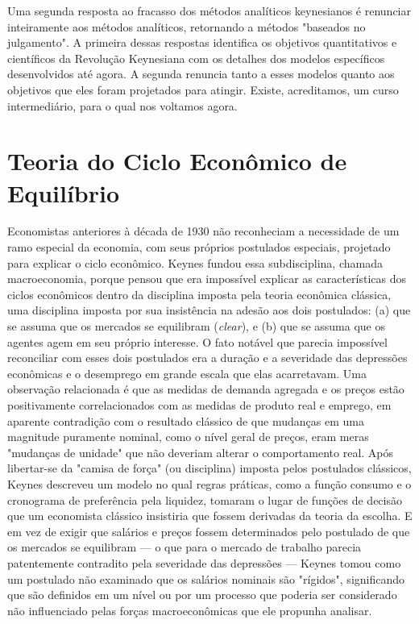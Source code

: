 \documentclass[12pt]{article}
\begin{document}
Uma segunda resposta ao fracasso dos métodos analíticos keynesianos é renunciar inteiramente aos métodos analíticos, retornando a métodos "baseados no julgamento". A primeira dessas respostas identifica os objetivos quantitativos e científicos da Revolução Keynesiana com os detalhes dos modelos específicos desenvolvidos até agora. A segunda renuncia tanto a esses modelos quanto aos objetivos que eles foram projetados para atingir. Existe, acreditamos, um curso intermediário, para o qual nos voltamos agora.

\section{Teoria do Ciclo Econômico de Equilíbrio}

Economistas anteriores à década de 1930 não reconheciam a necessidade de um ramo especial da economia, com seus próprios postulados especiais, projetado para explicar o ciclo econômico. Keynes fundou essa subdisciplina, chamada macroeconomia, porque pensou que era impossível explicar as características dos ciclos econômicos dentro da disciplina imposta pela teoria econômica clássica, uma disciplina imposta por sua insistência na adesão aos dois postulados: (a) que se assuma que os mercados se equilibram (\textit{clear}), e (b) que se assuma que os agentes agem em seu próprio interesse. O fato notável que parecia impossível reconciliar com esses dois postulados era a duração e a severidade das depressões econômicas e o desemprego em grande escala que elas acarretavam. Uma observação relacionada é que as medidas de demanda agregada e os preços estão positivamente correlacionados com as medidas de produto real e emprego, em aparente contradição com o resultado clássico de que mudanças em uma magnitude puramente nominal, como o nível geral de preços, eram meras "mudanças de unidade" que não deveriam alterar o comportamento real. Após libertar-se da "camisa de força" (ou disciplina) imposta pelos postulados clássicos, Keynes descreveu um modelo no qual regras práticas, como a função consumo e o cronograma de preferência pela liquidez, tomaram o lugar de funções de decisão que um economista clássico insistiria que fossem derivadas da teoria da escolha. E em vez de exigir que salários e preços fossem determinados pelo postulado de que os mercados se equilibram — o que para o mercado de trabalho parecia patentemente contradito pela severidade das depressões — Keynes tomou como um postulado não examinado que os salários nominais são "rígidos", significando que são definidos em um nível ou por um processo que poderia ser considerado não influenciado pelas forças macroeconômicas que ele propunha analisar.
\end{document}
